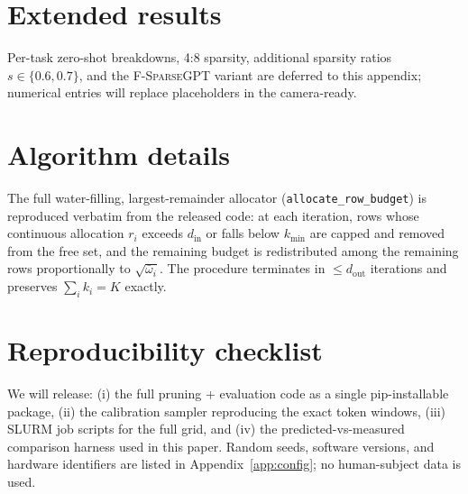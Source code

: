 \documentclass[11pt]{article}
\newcommand{\fsgpt}{\textsc{F-SparseGPT}}
\begin{document}
\section{Extended results}
\label{app:extended}

Per-task zero-shot breakdowns, 4{:}8 sparsity, additional sparsity ratios
$s \in \{0.6, 0.7\}$, and the \fsgpt{} variant are deferred to this
appendix; numerical entries will replace placeholders in the camera-ready.

\section{Algorithm details}
\label{app:alg}

The full water-filling, largest-remainder allocator
(\texttt{allocate\_row\_budget}) is reproduced verbatim from the released
code: at each iteration, rows whose continuous allocation $r_i$ exceeds
$d_\text{in}$ or falls below $k_\text{min}$ are capped and removed from
the free set, and the remaining budget is redistributed among the
remaining rows proportionally to $\sqrt{\bar\omega_i}$. The procedure
terminates in $\le d_\text{out}$ iterations and preserves $\sum_i k_i = K$
exactly.

\section{Reproducibility checklist}
\label{app:repro}

We will release: (i) the full pruning + evaluation code as a single
pip-installable package, (ii) the calibration sampler reproducing the
exact \citet{sun2024wanda} token windows, (iii) SLURM job scripts for
the full grid, and (iv) the predicted-vs-measured comparison harness used
in this paper. Random seeds, software versions, and hardware identifiers
are listed in Appendix~\ref{app:config}; no human-subject data is used.
\end{document}
